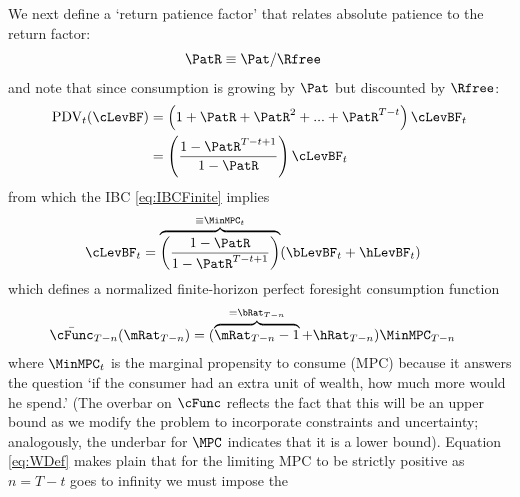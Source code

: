 \documentclass[./BufferStockTheory.tex]{subfiles}
\begin{document}
We next define a `return patience factor' that relates absolute patience to the return factor:
\begin{equation}\begin{gathered}\begin{aligned}
 \PatR  & \equiv  {\Pat}/\Rfree \label{eq:PatR}
\end{aligned}\end{gathered}\end{equation}
and note that since consumption is growing by $\Pat$ but discounted by $\Rfree$:
\begin{equation}\begin{gathered}\begin{aligned}
  \text{PDV}_{t}(\cLevBF)  & = \left(1+\PatR+\PatR^{2}+...+ \PatR^{T-t}\right)\cLevBF_{t} \notag
\\  & = \left(\frac{1-\PatR^{T-t+1}}{1-\PatR}\right)\cLevBF_{t}
\end{aligned}\end{gathered}\end{equation}
from which the IBC \eqref{eq:IBCFinite} implies
\begin{equation}\begin{gathered}\begin{aligned}
  \cLevBF_{t}  & = \overbrace{\left(\frac{1-\PatR}{1-\PatR^{T-t+1}}\right)}^{\equiv \MinMPC_{t}}
(\bLevBF_{t}+\hLevBF_{t})   \label{eq:WDef}
\end{aligned}\end{gathered}\end{equation}
which defines a normalized finite-horizon perfect foresight consumption function
\begin{equation}\begin{gathered}\begin{aligned}
  \bar{\cFunc}_{T-n}(\mRat_{T-n})  & = (\overbrace{\mRat_{T-n}-1}^{=\bRat_{T-n}}+\hRat_{T-n})\MinMPC_{T-n}
\end{aligned}\end{gathered}\end{equation}
where $\MinMPC_{t}$ is the marginal propensity to consume (MPC) because it answers the
question `if the consumer had an extra unit of wealth, how much more would he spend.'
(The overbar on $\cFunc$ reflects the fact that this will be an upper bound as we modify the problem to incorporate constraints and uncertainty; analogously, the underbar for $\MPC$ indicates that it is a lower bound).
Equation \eqref{eq:WDef} makes plain that for the limiting
MPC to be strictly positive as $n=T-t$ goes to infinity we must impose the
\end{document}
